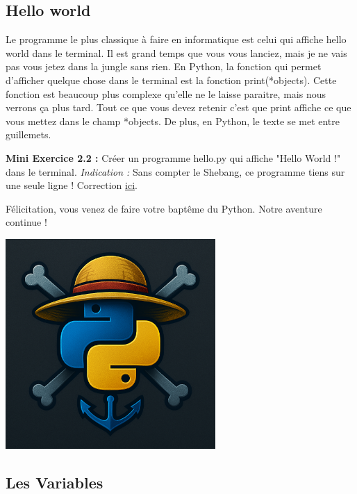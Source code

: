 \documentclass[a4paper,12pt]{article}
\begin{document}
\subsection{Hello world}

Le programme le plus classique à faire en informatique est celui qui affiche hello world dans le terminal. Il est grand temps que vous vous lanciez, mais je ne vais pas vous jetez dans la jungle sans rien.
En Python, la fonction qui permet d'afficher quelque chose dans le terminal est la fonction {\color{blue} print(*objects)}. 
Cette fonction est beaucoup plus complexe qu'elle ne le laisse paraitre, mais nous verrons ça plus tard. Tout ce que vous devez retenir c'est que print affiche ce que vous mettez dans le champ *objects.
De plus, en Python, le texte se met entre guillemets.

{\color{darkgreen}
\noindent\textbf{Mini Exercice 2.2 : } Créer un programme hello.py qui affiche "Hello World !" dans le terminal. \newline
\textit{Indication : } Sans compter le Shebang, ce programme tiens sur une seule ligne ! \newline
Correction \hyperlink{AncreExo2.2}{ici}.\newline
}

Félicitation, vous venez de faire votre baptême du Python. Notre aventure continue !

\begin{center}
    \includegraphics[keepaspectratio=true, width=0.6\textwidth]{../images/Pyhon_OnePiece.png}
\end{center}


\subsection{Les Variables}
\end{document}
